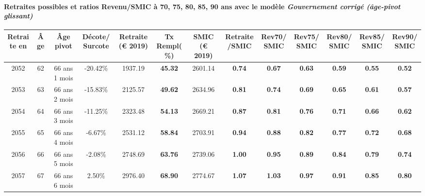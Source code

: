 \paragraph{Retraites possibles et ratios Revenu/SMIC à 70, 75, 80, 85, 90 ans avec le modèle \emph{Gouvernement corrigé (âge-pivot glissant)}}  
 
{ \scriptsize \begin{center} 
\begin{tabular}[htb]{|c|c||c|c||c|c||c||c|c|c|c|c|c|} 
\hline 
 Retraite en &  Âge &  Âge pivot &  Décote/Surcote &  Retraite (\euro{} 2019) &  Tx Rempl(\%) &  SMIC (\euro{} 2019) &  Retraite/SMIC &  Rev70/SMIC &  Rev75/SMIC &  Rev80/SMIC &  Rev85/SMIC &  Rev90/SMIC \\ 
\hline \hline 
 2052 &  62 &  66 ans 1 mois &  -20.42\% &  1937.19 &  {\bf 45.32} &  2601.14 &  {\bf {\color{red} 0.74}} &  {\bf {\color{red} 0.67}} &  {\bf {\color{red} 0.63}} &  {\bf {\color{red} 0.59}} &  {\bf {\color{red} 0.55}} &  {\bf {\color{red} 0.52}} \\ 
\hline 
 2053 &  63 &  66 ans 2 mois &  -15.83\% &  2125.57 &  {\bf 49.62} &  2634.96 &  {\bf {\color{red} 0.81}} &  {\bf {\color{red} 0.74}} &  {\bf {\color{red} 0.69}} &  {\bf {\color{red} 0.65}} &  {\bf {\color{red} 0.61}} &  {\bf {\color{red} 0.57}} \\ 
\hline 
 2054 &  64 &  66 ans 3 mois &  -11.25\% &  2323.48 &  {\bf 54.13} &  2669.21 &  {\bf {\color{red} 0.87}} &  {\bf {\color{red} 0.81}} &  {\bf {\color{red} 0.76}} &  {\bf {\color{red} 0.71}} &  {\bf {\color{red} 0.66}} &  {\bf {\color{red} 0.62}} \\ 
\hline 
 2055 &  65 &  66 ans 4 mois &  -6.67\% &  2531.12 &  {\bf 58.84} &  2703.91 &  {\bf {\color{red} 0.94}} &  {\bf {\color{red} 0.88}} &  {\bf {\color{red} 0.82}} &  {\bf {\color{red} 0.77}} &  {\bf {\color{red} 0.72}} &  {\bf {\color{red} 0.68}} \\ 
\hline 
 2056 &  66 &  66 ans 5 mois &  -2.08\% &  2748.69 &  {\bf 63.76} &  2739.06 &  {\bf 1.00} &  {\bf {\color{red} 0.95}} &  {\bf {\color{red} 0.89}} &  {\bf {\color{red} 0.84}} &  {\bf {\color{red} 0.79}} &  {\bf {\color{red} 0.74}} \\ 
\hline 
 2057 &  67 &  66 ans 6 mois &  2.50\% &  2976.40 &  {\bf 68.90} &  2774.67 &  {\bf 1.07} &  {\bf 1.03} &  {\bf {\color{red} 0.97}} &  {\bf {\color{red} 0.91}} &  {\bf {\color{red} 0.85}} &  {\bf {\color{red} 0.80}} \\ 
\hline 
\hline 
\end{tabular} 
\end{center} } 
